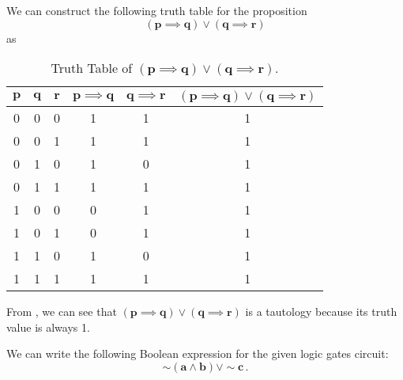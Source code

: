 \begin{subquestions}
\subquestion

\begin{subsubquestions}
	
\subsubquestion

We can construct the following truth table for the proposition 
\begin{equation}
	\boldsymbol{(p \implies q) \lor (q \implies r)}
\end{equation} as

\begin{table}[H]
	\centering
	\begin{tabular}{|c|c|c|c|c|c|}
		\hline
		$\boldsymbol{p}$ & $\boldsymbol{q}$ & $\boldsymbol{r}$ & $\boldsymbol{p \implies q}$ & $\boldsymbol{q \implies r}$ & $\boldsymbol{(p \implies q) \lor (q \implies r)}$ \\
		\hline
		0 & 0 & 0 & 1 & 1 & 1 \\
		0 & 0 & 1 & 1 & 1 & 1 \\
		0 & 1 & 0 & 1 & 0 & 1 \\
		0 & 1 & 1 & 1 & 1 & 1 \\
		1 & 0 & 0 & 0 & 1 & 1 \\
		1 & 0 & 1 & 0 & 1 & 1 \\
		1 & 1 & 0 & 1 & 0 & 1 \\
		1 & 1 & 1 & 1 & 1 & 1 \\
		\hline
	\end{tabular}
	\caption{\label{2014:q1:tab:Tab2} Truth Table of $\boldsymbol{(p \implies q) \lor (q \implies r)}$.}
\end{table}


\subsubquestion

From , we can see that $\boldsymbol{(p \implies q) \lor (q \implies r)}$ is a tautology because its truth value is always 1.
\end{subsubquestions}


\subquestion

We can write the following Boolean expression for the given logic gates circuit:
\begin{equation}
	\boldsymbol{\sim (a \land b) \lor \sim c}\,.
\end{equation}


\end{subquestions}
